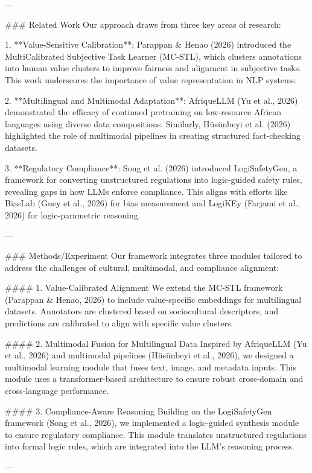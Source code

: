 ---

### Related Work  
Our approach draws from three key areas of research:

1. **Value-Sensitive Calibration**: Parappan & Henao (2026) introduced the MultiCalibrated Subjective Task Learner (MC-STL), which clusters annotations into human value clusters to improve fairness and alignment in subjective tasks. This work underscores the importance of value representation in NLP systems.

2. **Multilingual and Multimodal Adaptation**: AfriqueLLM (Yu et al., 2026) demonstrated the efficacy of continued pretraining on low-resource African languages using diverse data compositions. Similarly, Hüsünbeyi et al. (2026) highlighted the role of multimodal pipelines in creating structured fact-checking datasets.

3. **Regulatory Compliance**: Song et al. (2026) introduced LogiSafetyGen, a framework for converting unstructured regulations into logic-guided safety rules, revealing gaps in how LLMs enforce compliance. This aligns with efforts like BiasLab (Guey et al., 2026) for bias measurement and LogiKEy (Farjami et al., 2026) for logic-parametric reasoning.

---

### Methods/Experiment  
Our framework integrates three modules tailored to address the challenges of cultural, multimodal, and compliance alignment:

#### 1. Value-Calibrated Alignment  
We extend the MC-STL framework (Parappan & Henao, 2026) to include value-specific embeddings for multilingual datasets. Annotators are clustered based on sociocultural descriptors, and predictions are calibrated to align with specific value clusters.

#### 2. Multimodal Fusion for Multilingual Data  
Inspired by AfriqueLLM (Yu et al., 2026) and multimodal pipelines (Hüsünbeyi et al., 2026), we designed a multimodal learning module that fuses text, image, and metadata inputs. This module uses a transformer-based architecture to ensure robust cross-domain and cross-language performance.

#### 3. Compliance-Aware Reasoning  
Building on the LogiSafetyGen framework (Song et al., 2026), we implemented a logic-guided synthesis module to ensure regulatory compliance. This module translates unstructured regulations into formal logic rules, which are integrated into the LLM's reasoning process.

---

